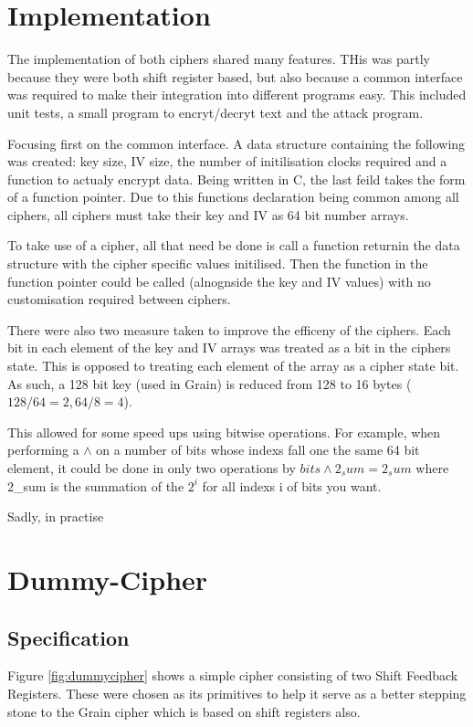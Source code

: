 \documentclass{report}
\begin{document}
\section{Implementation}
The implementation of both ciphers shared many features. THis was partly because they were both shift register based, but also because a common interface was required to make their integration into different programs easy. This included unit tests, a small program to encryt/decryt text and the attack program.

Focusing first on the common interface. A data structure containing the following was created: key size, IV size, the number of initilisation clocks required and a function to actualy encrypt data. Being written in C, the last feild takes the form of a function pointer. Due to this functions declaration being common among all ciphers, all ciphers must take their key and IV as 64 bit number arrays.

To take use of a cipher, all that need be done is call a function returnin the data structure with the cipher specific values initilised. Then the function in the function pointer could be called (alnognside the key and IV values) with no customisation required between ciphers.

There were also two measure taken to improve the efficeny of the ciphers. Each bit in each element of the key and IV arrays was treated as a bit in the ciphers state. This is opposed to treating each element of the array as a cipher state bit. As such, a 128 bit key (used in Grain) is reduced from 128 to 16 bytes ($128/64 = 2, 64/8=4$).

This allowed for some speed ups using bitwise operations. For example, when performing a $\land$ on a number of bits whose indexs fall one the same 64 bit element, it could be done in only two operations by $bits \land 2_sum = 2_sum$ where 2_sum is the summation of the $2^i$ for all indexs i of bits you want.

Sadly, in practise %

\section{Dummy-Cipher}
\subsection{Specification}
Figure \ref{fig:dummycipher} shows a simple cipher consisting of two Shift Feedback Registers. These were chosen as its primitives to help it serve as a better stepping stone to the Grain cipher which is based on shift registers also.
\end{document}
